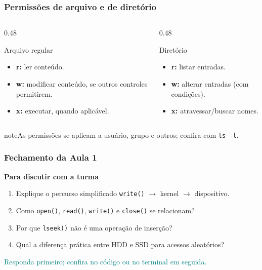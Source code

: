 \documentclass[aspectratio=169,11pt]{beamer}
\begin{document}
\begin{frame}
\frametitle{Permissões de arquivo e de diretório}
\begin{columns}[T,onlytextwidth]
\begin{column}{0.48\textwidth}
\begin{block}{Arquivo regular}\small\begin{itemize}
\item \textbf{r:} ler conteúdo.
\item \textbf{w:} modificar conteúdo, se outros controles permitirem.
\item \textbf{x:} executar, quando aplicável.
\end{itemize}\end{block}\end{column}
\begin{column}{0.48\textwidth}
\begin{block}{Diretório}\small\begin{itemize}
\item \textbf{r:} listar entradas.
\item \textbf{w:} alterar entradas (com condições).
\item \textbf{x:} atravessar/buscar nomes.
\end{itemize}\end{block}\end{column}\end{columns}
\vfill\begin{beamercolorbox}[wd=\textwidth,sep=2mm,rounded=true]{note}\small As permissões se aplicam a usuário, grupo e outros; confira com \texttt{ls -l}.\end{beamercolorbox}

\end{frame}

\begin{frame}
\frametitle{Fechamento da Aula 1}
{\large\textbf{Para discutir com a turma}}\par\medskip\begin{enumerate}\item Explique o percurso simplificado \texttt{write()} $\rightarrow$ kernel $\rightarrow$ dispositivo.
\item Como \texttt{open()}, \texttt{read()}, \texttt{write()} e \texttt{close()} se relacionam?
\item Por que \texttt{lseek()} não é uma operação de inserção?
\item Qual a diferença prática entre HDD e SSD para acessos aleatórios?
\end{enumerate}\vfill\textcolor{teal}{\footnotesize Responda primeiro; confira no código ou no terminal em seguida.}
\end{frame}
\end{document}
